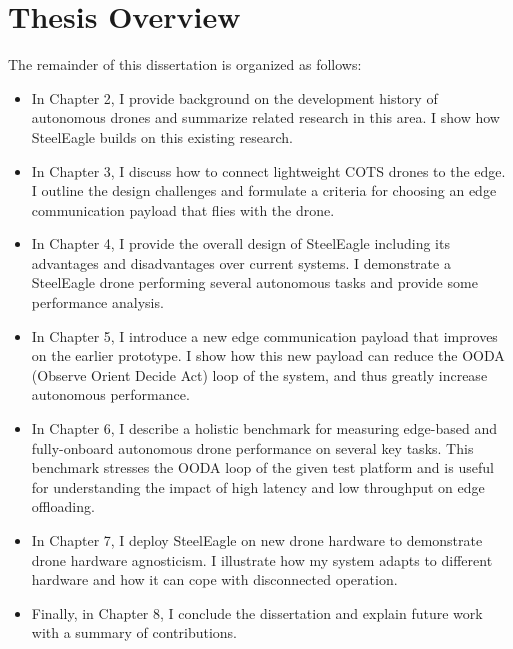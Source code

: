\section{Thesis Overview}
The remainder of this dissertation is organized as follows:
\begin{itemize}
    \item In Chapter 2, I provide background on the development history of autonomous drones and summarize related research in this area. I show how SteelEagle builds on this existing research.
    \item In Chapter 3, I discuss how to connect lightweight COTS drones to the edge. I outline the design challenges and formulate a criteria for choosing an edge communication payload that flies with the drone.
    \item In Chapter 4, I provide the overall design of SteelEagle including its advantages and disadvantages over current systems. I demonstrate a SteelEagle drone performing several autonomous tasks and provide some performance analysis.
    \item In Chapter 5, I introduce a new edge communication payload that improves on the earlier prototype. I show how this new payload can reduce the OODA (Observe Orient Decide Act) loop of the system, and thus greatly increase autonomous performance.
    \item In Chapter 6, I describe a holistic benchmark for measuring edge-based and fully-onboard autonomous drone performance on several key tasks. This benchmark stresses the OODA loop of the given test platform and is useful for understanding the impact of high latency and low throughput on edge offloading.
    \item In Chapter 7, I deploy SteelEagle on new drone hardware to demonstrate drone hardware agnosticism. I illustrate how my system adapts to different hardware and how it can cope with disconnected operation.
    \item Finally, in Chapter 8, I conclude the dissertation and explain future work with a summary of contributions.
\end{itemize}

